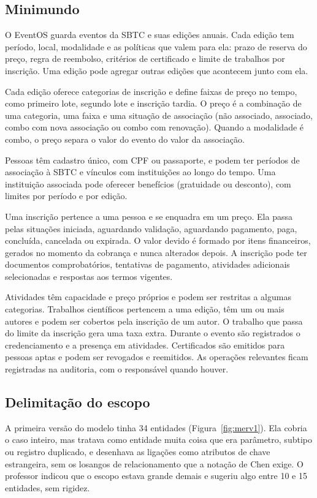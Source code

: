 \subsection{Minimundo}

O EventOS guarda eventos da SBTC e suas edições anuais. Cada edição tem período, local, modalidade e as políticas que valem para ela: prazo de reserva do preço, regra de reembolso, critérios de certificado e limite de trabalhos por inscrição. Uma edição pode agregar outras edições que acontecem junto com ela.

Cada edição oferece categorias de inscrição e define faixas de preço no tempo, como primeiro lote, segundo lote e inscrição tardia. O preço é a combinação de uma categoria, uma faixa e uma situação de associação (não associado, associado, combo com nova associação ou combo com renovação). Quando a modalidade é combo, o preço separa o valor do evento do valor da associação.

Pessoas têm cadastro único, com CPF ou passaporte, e podem ter períodos de associação à SBTC e vínculos com instituições ao longo do tempo. Uma instituição associada pode oferecer benefícios (gratuidade ou desconto), com limites por período e por edição.

Uma inscrição pertence a uma pessoa e se enquadra em um preço. Ela passa pelas situações iniciada, aguardando validação, aguardando pagamento, paga, concluída, cancelada ou expirada. O valor devido é formado por itens financeiros, gerados no momento da cobrança e nunca alterados depois. A inscrição pode ter documentos comprobatórios, tentativas de pagamento, atividades adicionais selecionadas e respostas aos termos vigentes.

Atividades têm capacidade e preço próprios e podem ser restritas a algumas categorias. Trabalhos científicos pertencem a uma edição, têm um ou mais autores e podem ser cobertos pela inscrição de um autor. O trabalho que passa do limite da inscrição gera uma taxa extra. Durante o evento são registrados o credenciamento e a presença em atividades. Certificados são emitidos para pessoas aptas e podem ser revogados e reemitidos. As operações relevantes ficam registradas na auditoria, com o responsável quando houver.

\subsection{Delimitação do escopo}
\label{sec:escopo}

A primeira versão do modelo tinha 34 entidades (Figura~\ref{fig:merv1}). Ela cobria o caso inteiro, mas tratava como entidade muita coisa que era parâmetro, subtipo ou registro duplicado, e desenhava as ligações como atributos de chave estrangeira, sem os losangos de relacionamento que a notação de Chen exige. O professor indicou que o escopo estava grande demais e sugeriu algo entre 10 e 15 entidades, sem rigidez.

